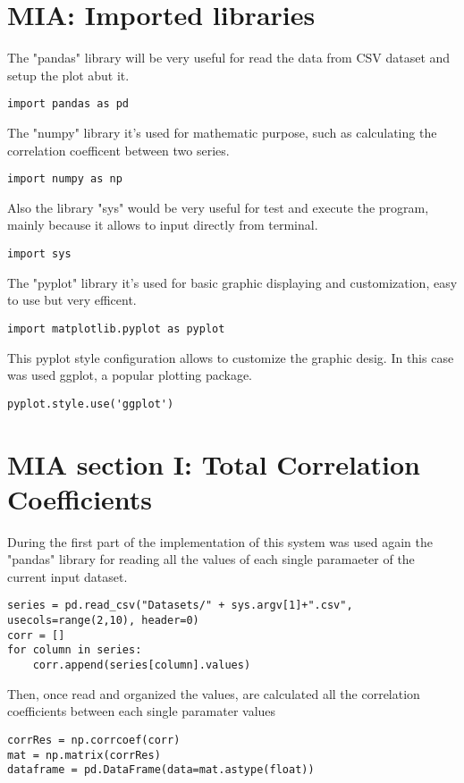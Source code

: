 \label{MIA_Implementation}
\section{MIA: Imported libraries}
\label{MIA_Libraries}
The "pandas" library will be very useful for read the data from CSV dataset and setup the plot abut it.
\begin{lstlisting}
import pandas as pd
\end{lstlisting}

The "numpy" library it's used for mathematic purpose, such as calculating the correlation coefficent between two series.
\begin{lstlisting}
import numpy as np
\end{lstlisting}

Also the library "sys" would be very useful for test and execute the program, mainly because it allows to input directly from terminal.
\begin{lstlisting}
import sys
\end{lstlisting}

The "pyplot" library it's used for basic graphic displaying and customization, easy to use but very efficent.
\begin{lstlisting}
import matplotlib.pyplot as pyplot
\end{lstlisting}


This pyplot style configuration allows to customize the graphic desig. In this case was used ggplot, a popular plotting package.
\begin{lstlisting}
pyplot.style.use('ggplot')
\end{lstlisting}
 

\section{MIA section I: Total Correlation Coefficients}
\label{MIA_section_I}

During the first part of the implementation of this system was used again the "pandas" library for reading all the values of each single paramaeter of the current input dataset.
\begin{lstlisting}
series = pd.read_csv("Datasets/" + sys.argv[1]+".csv", usecols=range(2,10), header=0)
corr = []
for column in series:
    corr.append(series[column].values)
\end{lstlisting} 

Then, once read and organized the values, are calculated all the correlation coefficients between each single paramater values
\begin{lstlisting}
corrRes = np.corrcoef(corr)
mat = np.matrix(corrRes)
dataframe = pd.DataFrame(data=mat.astype(float))
\end{lstlisting} 

